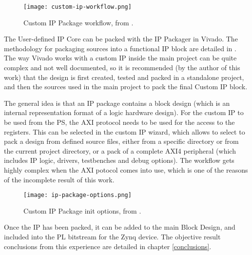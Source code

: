 \begin{figure}[htp]
	\centering
	\texttt{[image: custom-ip-workflow.png]}
	\caption{Custom IP Package workflow, from \cite{UG1118}.}
	\label{fig:custom-ip-workflow}
\end{figure}

The User-defined IP Core can be packed with the IP Packager in Vivado. The methodology for packaging
sources into a functional IP block are detailed in \cite{UG1118}. The way Vivado works with a custom
IP inside the main project can be quite complex and not well documented, so it is recommended (by
the author of this work) that the design is first created, tested and packed in a standalone
project, and then the sources used in the main project to pack the final Custom IP block.

The general idea is that an IP package contains a block design (which is an internal representation
format of a logic hardware design). For the custom IP to be used from the PS, the AXI protocol needs
to be used for the access to the registers. This can be selected in the custom IP wizard, which
allows to select to pack a design from defined source files, either from a specific directory or
from the current project directory, or a pack of a complete AXI4 peripheral (which includes IP
logic, drivers, testbenches and debug options). The workflow gets highly complex when the AXI
potocol comes into use, which is one of the reasons of the incomplete result of this work.

\begin{figure}[htp]
	\centering
	\texttt{[image: ip-package-options.png]}
	\caption{Custom IP Package init options, from \cite{UG1118}.}
	\label{fig:ip-package-options}
\end{figure}

Once the IP has been packed, it can be added to the main Block Design, and included into the PL
bitstream for the Zynq device. The objective result conclusions from this experience are detailed in
chapter \ref{conclusions}.
